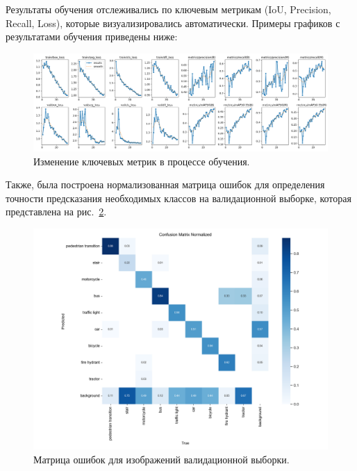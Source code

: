 Результаты обучения отслеживались по ключевым метрикам (IoU, Precision, Recall, Loss), которые визуализировались автоматически. Примеры графиков с результатами обучения приведены ниже:

\begin{figure}[H]
    \centering
    \includegraphics[width=1\linewidth]{imgs/results.png}
    \caption{Изменение ключевых метрик в процессе обучения.}
    \label{fig:metrics}
\end{figure}
\vspace{-0.5cm}

Также, была построена нормализованная матрица ошибок для определения точности предсказания необходимых классов на валидационной выборке, которая представлена на рис.~\ref{fig:confusion}.

\begin{figure}[H]
    \centering
    \includegraphics[width=1\linewidth]{imgs/confusion_matrix_normalized.png}
    \caption{Матрица ошибок для изображений валидационной выборки.}
    \label{fig:confusion}
\end{figure}
\vspace{-0.5cm}

